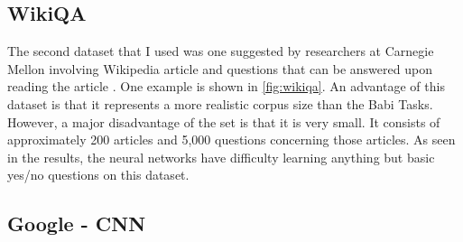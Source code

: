 \documentclass{article}
\begin{document}
\subsection{WikiQA}

The second dataset that I used was one suggested by researchers at Carnegie Mellon involving Wikipedia article and questions that can be answered upon reading the article \cite{cmu}.  One example is shown in \ref{fig:wikiqa}.  An advantage of this dataset is that it represents a more realistic corpus size than the Babi Tasks.  However, a major disadvantage of the set is that it is very small.  It consists of approximately 200 articles and 5,000 questions concerning those articles.  As seen in the results, the neural networks have difficulty learning anything but basic yes/no questions on this dataset.  


\subsection{Google - CNN}
\end{document}
